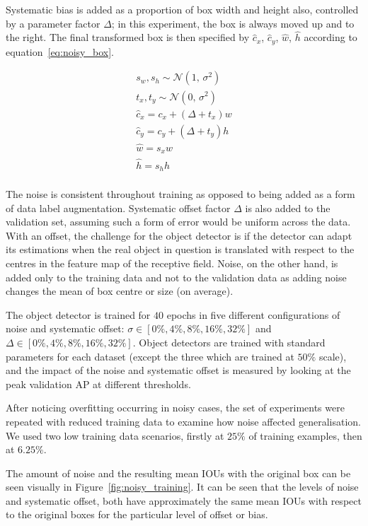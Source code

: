\documentclass[conference]{IEEEtran}
\begin{document}
Systematic bias is added as a proportion of box width and height also, controlled by a parameter factor $\Delta$; in this experiment, the box is always moved up and to the right. The final transformed box is then specified by $\hat{c}_x$, $\hat{c}_y$, $\hat{w}$, $\hat{h}$ according to equation~\ref{eq:noisy_box}. 

\begin{equation}
\begin{split}
    s_w, s_h \sim \mathcal{N}(1,\,\sigma^{2})\\
    t_x, t_y \sim \mathcal{N}(0,\,\sigma^{2})\\
    \hat{c}_x = c_x + (\Delta + t_x) w\\
    \hat{c}_y = c_y + (\Delta + t_y) h\\
    \hat{w} = s_x w\\
    \hat{h} = s_h h\\
\end{split}
\label{eq:noisy_box}
\end{equation}

The noise is consistent throughout training as opposed to being added as a form of data label augmentation. Systematic offset factor $\Delta$ is also added to the validation set, assuming such a form of error would be uniform across the data. With an offset, the challenge for the object detector is if the detector can adapt its estimations when the real object in question is translated with respect to the centres in the feature map of the receptive field. Noise, on the other hand, is added only to the training data and not to the validation data as adding noise changes the mean of box centre or size (on average).

The object detector is trained for $40$ epochs in five different configurations of noise and systematic offset: $\sigma \in [0\%, 4\%, 8\%, 16\%, 32\%]$ and $\Delta \in [0\%, 4\%, 8\%, 16\%, 32\%]$. Object detectors are trained with standard parameters for each dataset (except the three which are trained at $50\%$ scale), and the impact of the noise and systematic offset is measured by looking at the peak validation \gls{AP} at different thresholds.

After noticing overfitting occurring in noisy cases, the set of experiments were repeated with reduced training data to examine how noise affected generalisation. We used two low training data scenarios, firstly at $25\%$ of training examples, then at $6.25\%$.

The amount of noise and the resulting mean \gls{IOU}s with the original box can be seen visually in Figure~\ref{fig:noisy_training}. It can be seen that the levels of noise and systematic offset, both have approximately the same mean \gls{IOU}s with respect to the original boxes for the particular level of offset or bias.
\end{document}
